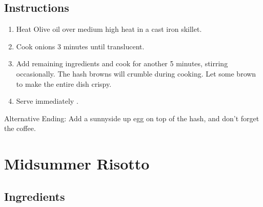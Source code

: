 \documentclass[ansiapaper,10pt,english]{sphinxmanual}
\begin{document}
\section{Instructions}
\label{\detokenize{Hangover_Hash:instructions}}\begin{enumerate}
\item {} 
Heat Olive oil over medium high heat in a cast iron skillet.

\item {} 
Cook onions 3 minutes until translucent.

\item {} 
Add remaining ingredients and cook for another 5 minutes, stirring occasionally. The hash browns will crumble during cooking. Let some brown to make the entire dish crispy.

\item {} 
Serve immediately .

\end{enumerate}

Alternative Ending: Add a sunnyside up egg on top of the hash, and don’t forget the coffee.


\chapter{Midsummer Risotto}
\label{\detokenize{Mid_Risotto:midsummer-risotto}}\label{\detokenize{Mid_Risotto::doc}}

\section{Ingredients}
\label{\detokenize{Mid_Risotto:ingredients}}
%
\begin{sphinxVerbatim}[commandchars=\\\{\}]
   

     

   

   

   

   

    

   

  

   

    

    
\end{sphinxVerbatim}
\end{document}
